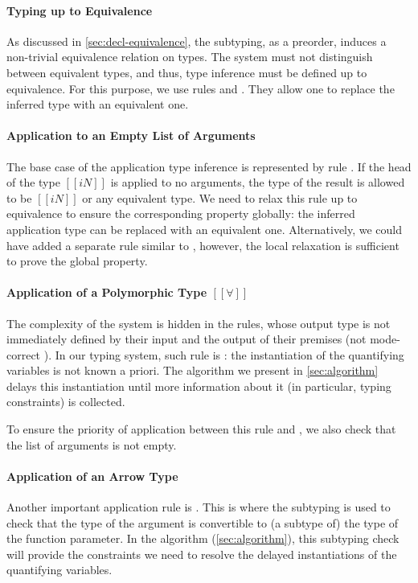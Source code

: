 \paragraph{Typing up to Equivalence}
  As discussed in \cref{sec:decl-equivalence}, the subtyping, as a preorder, 
  induces a non-trivial equivalence relation on types. 
  The system must not distinguish between equivalent types,
  and thus, type inference must be defined up to equivalence. 
  For this purpose, we use rules   
  and .
  They allow one to replace the inferred type with an equivalent one.  

\paragraph{Application to an Empty List of Arguments}
  The base case of the application type inference is 
  represented by rule .
  If the head of the type $[[iN]]$ is applied to no arguments, 
  the type of the result is allowed to be $[[iN]]$ or any 
  equivalent type. We need to relax this rule up to equivalence
  to ensure the corresponding property globally:
  the inferred application type can be replaced with an equivalent one.
  Alternatively, we could have added a separate rule similar to 
  , however, 
  the local relaxation is sufficient to prove the global property.

\paragraph{Application of a Polymorphic Type $[[∀]]$}
  The complexity of the system is hidden in the rules, 
  whose output type is not immediately defined by their input
  and the output of their premises 
  (\aka not mode-correct \cite{dunfield2020:bidirectional}).
  In our typing system, such rule is : 
  the instantiation of the quantifying variables is
  not known a priori. The algorithm we present in \cref{sec:algorithm} 
  delays this instantiation until more information about it 
  (in particular, typing constraints) is collected.

  To ensure the priority of application between this rule and 
  , we also check that 
  the list of arguments is not empty.

\paragraph{Application of an Arrow Type}
  Another important application rule is .
  This is where the subtyping is used to check that the type of the argument
  is convertible to (a subtype of) the type of the function parameter.
  In the algorithm (\cref{sec:algorithm}), this subtyping check will provide the constraints
  we need to resolve the delayed instantiations of the quantifying variables.

